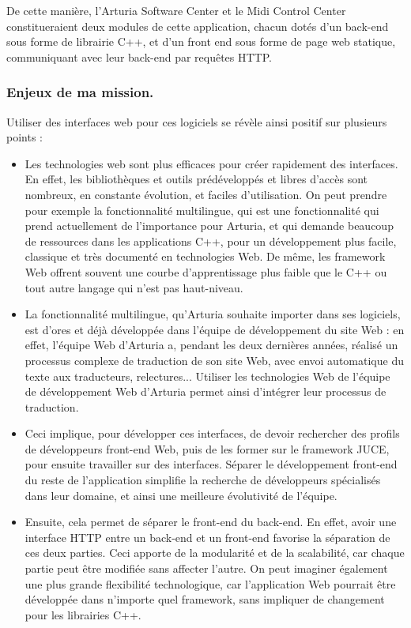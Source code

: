 \documentclass[francais]{rapportPFE}  %
\begin{document}
De cette manière, l'Arturia Software Center et le Midi Control Center constitueraient deux modules de cette application, chacun dotés d'un back-end sous forme de librairie C++, et d'un front end sous forme de page web statique, communiquant avec leur back-end par requêtes HTTP.\\

\subsubsection{Enjeux de ma mission.}

Utiliser des interfaces web pour ces logiciels se révèle ainsi positif sur plusieurs points : 
\begin{itemize}
	\item Les technologies web sont plus efficaces pour créer rapidement des interfaces. En effet, les bibliothèques et outils prédéveloppés et libres d'accès sont nombreux, en constante évolution, et faciles d'utilisation. On peut prendre pour exemple la fonctionnalité multilingue, qui est une fonctionnalité qui prend actuellement de l'importance pour Arturia, et qui demande beaucoup de ressources dans les applications C++, pour un développement plus facile, classique et très documenté en technologies Web. De même, les framework Web offrent souvent une courbe d'apprentissage plus faible que le C++ ou tout autre langage qui n'est pas haut-niveau.
	\item La fonctionnalité multilingue, qu'Arturia souhaite importer dans ses logiciels, est d'ores et déjà développée dans l'équipe de développement du site Web : en effet, l'équipe Web d'Arturia a, pendant les deux dernières années, réalisé un processus complexe de traduction de son site Web, avec envoi automatique du texte aux traducteurs, relectures... Utiliser les technologies Web de l'équipe de développement Web d'Arturia permet ainsi d'intégrer leur processus de traduction.
	\item Ceci implique, pour développer ces interfaces, de devoir rechercher des profils de développeurs front-end Web, puis de les former sur le framework JUCE, pour ensuite travailler sur des interfaces. Séparer le développement front-end du reste de l'application simplifie la recherche de développeurs spécialisés dans leur domaine, et ainsi une meilleure évolutivité de l'équipe.
	\item Ensuite, cela permet de séparer le front-end du back-end. En effet, avoir une interface HTTP entre un back-end et un front-end favorise la séparation de ces deux parties. Ceci apporte de la modularité et de la scalabilité, car chaque partie peut être modifiée sans affecter l'autre. On peut imaginer également une plus grande flexibilité technologique, car l'application Web pourrait être développée dans n'importe quel framework, sans impliquer de changement pour les librairies C++.
\end{itemize}
\end{document}
